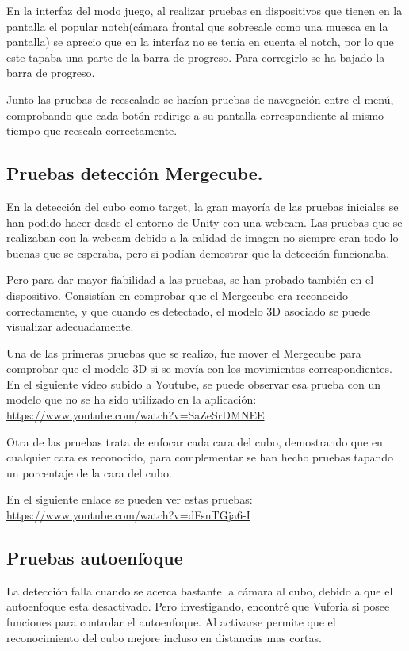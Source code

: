 En la interfaz del modo juego, al realizar pruebas en dispositivos que tienen en la pantalla el popular notch(cámara frontal que sobresale como una muesca en la pantalla) se aprecio que en la interfaz no se tenía en cuenta el notch, por lo que este tapaba una parte de la barra de progreso. Para corregirlo se ha bajado la barra de progreso.

Junto las pruebas de reescalado se hacían pruebas de navegación entre el menú, comprobando que cada botón redirige a su pantalla correspondiente al mismo tiempo que reescala correctamente.

\subsection{Pruebas detección Mergecube.}
En la detección del cubo como target, la gran mayoría de las pruebas iniciales se han podido hacer desde el entorno de Unity con una webcam. Las pruebas que se realizaban con la webcam debido a la calidad de imagen no siempre eran todo lo buenas que se esperaba, pero si podían demostrar que la detección funcionaba.

Pero para dar mayor fiabilidad a las pruebas, se han probado también en el dispositivo. Consistían en comprobar que el Mergecube era reconocido correctamente, y que cuando es detectado, el modelo 3D asociado se puede visualizar adecuadamente.

Una de las primeras pruebas que se realizo, fue mover el Mergecube para comprobar que el modelo 3D si se movía con los movimientos correspondientes. En el siguiente vídeo subido a Youtube, se puede observar esa prueba con un modelo que no se ha sido utilizado en la aplicación: \url{https://www.youtube.com/watch?v=SaZeSrDMNEE}

Otra de las pruebas trata de enfocar cada cara del cubo, demostrando que en cualquier cara es reconocido, para complementar se han hecho pruebas tapando un porcentaje de la cara del cubo. 

En el siguiente enlace se pueden ver estas pruebas:\\ \url{https://www.youtube.com/watch?v=dFsnTGja6-I}

\subsection{Pruebas autoenfoque}
La detección falla cuando se acerca bastante la cámara al cubo, debido a que el autoenfoque esta desactivado. Pero investigando, encontré que Vuforia si posee funciones para controlar el autoenfoque. Al activarse permite que el reconocimiento del cubo mejore incluso en distancias mas cortas.

